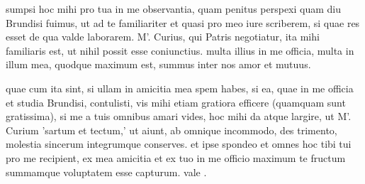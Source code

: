 


 sumpsi hoc mihi pro tua in me observantia, quam penitus perspexi quam diu Brundisi fuimus, ut ad te familiariter et quasi pro meo iure scriberem, si quae res esset de qua valde laborarem. M'. Curius, qui Patris negotiatur, ita mihi familiaris est, ut nihil possit esse coniunctius. multa illius in me officia, multa in illum mea, quodque maximum est, summus inter nos amor et mutuus.

 quae cum ita sint, si ullam in amicitia mea spem habes, si ea, quae in me officia et studia Brundisi, contulisti, vis mihi etiam gratiora efficere (quamquam sunt gratissima), si me a tuis omnibus amari vides, hoc mihi da atque largire, ut M'. Curium 'sartum et tectum,' ut aiunt, ab omnique incommodo, des trimento, molestia sincerum integrumque conserves. et ipse spondeo et omnes hoc tibi tui pro me recipient, ex mea amicitia et ex tuo in me officio maximum te fructum summamque voluptatem esse capturum. vale .
